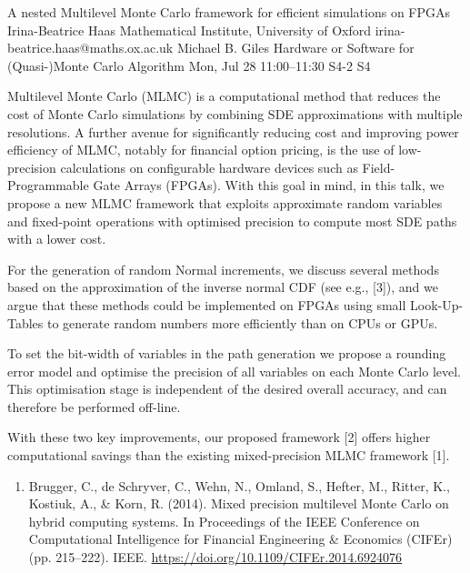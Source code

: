 \documentclass[12pt,lettersize,oneside]{book} %
\begin{document}
\begin{talk}
  {A nested Multilevel Monte Carlo framework for efficient simulations on FPGAs}%
  {Irina-Beatrice Haas}%
  {Mathematical Institute, University of Oxford}%
  {irina-beatrice.haas@maths.ox.ac.uk}%
  {Michael B. Giles}%
  {Hardware or Software for (Quasi-)Monte Carlo Algorithm}%
  {Mon, Jul 28 11:00--11:30}%
  {S4-2}%
  {S4}%
    
   

Multilevel Monte Carlo (MLMC) is a computational method that reduces the cost of Monte Carlo simulations by combining SDE approximations with multiple resolutions. A further avenue for significantly reducing cost and improving power efficiency of MLMC, notably for financial option pricing, is the use of low-precision calculations on configurable hardware devices such as Field-Programmable Gate Arrays (FPGAs). With this goal in mind, in this talk, we propose a new MLMC framework that exploits approximate random variables and fixed-point operations with optimised precision to compute most SDE paths with a lower cost.

For the generation of random Normal increments, we discuss several methods based on the approximation of the inverse normal CDF (see e.g., [3]), and we argue that these methods could be implemented on FPGAs using small Look-Up-Tables to generate random numbers more efficiently than on CPUs or GPUs. 

To set the bit-width of variables in the path generation we propose a rounding error model and optimise the precision of all variables on each Monte Carlo level. This optimisation stage is independent of the desired overall accuracy, and can therefore be performed off-line. 

With these two key improvements, our proposed framework [2] offers higher computational
savings than the existing mixed-precision MLMC framework [1].


\medskip


\begin{enumerate}

    \item[{[1]}] Brugger, C., de Schryver, C., Wehn, N., Omland, S., Hefter, M., Ritter, K., Kostiuk, A., \& Korn, R. (2014). Mixed precision multilevel Monte Carlo on hybrid computing systems. In Proceedings of the IEEE Conference on Computational Intelligence for Financial Engineering \& Economics (CIFEr) (pp. 215--222). IEEE. \url{https://doi.org/10.1109/CIFEr.2014.6924076}
    

\end{enumerate}
\end{talk}
\end{document}
